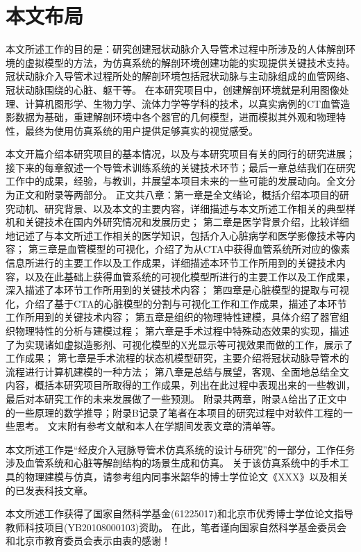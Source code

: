 \section{本文布局}
\label{sec1-4}

本文所述工作的目的是：研究创建冠状动脉介入导管术过程中所涉及的人体解剖环境的虚拟模型的方法，为仿真系统的解剖环境创建功能的实现提供关键技术支持。
冠状动脉介入导管术过程所处的解剖环境包括冠状动脉与主动脉组成的血管网络、冠状动脉围绕的心脏、躯干等。
在本研究项目中，创建解剖环境就是利用图像处理、计算机图形学、生物力学、流体力学等学科的技术，以真实病例的CT血管造影数据为基础，重建解剖环境中各个器官的几何模型，进而模拟其外观和物理特性，最终为使用仿真系统的用户提供足够真实的视觉感受。

本文开篇介绍本研究项目的基本情况，以及与本研究项目有关的同行的研究进展；接下来的每章叙述一个导管术训练系统的关键技术环节；最后一章总结我们在研究工作中的成果，经验，与教训，并展望本项目未来的一些可能的发展动向。全文分为正文和附录等两部分。
正文共八章：第一章是全文绪论，概括介绍本项目的研究动机、研究背景、以及本文的主要内容，详细描述与本文所述工作相关的典型样机和关键技术在国内外研究情况和发展历史；
第二章是医学背景介绍，比较详细地记述了与本文所述工作相关的医学知识，包括介入心脏病学和医学影像技术等内容；
第三章是血管模型的可视化，介绍了为从CTA中获得血管系统所对应的像素信息所进行的主要工作以及工作成果，详细描述本环节工作所用到的关键技术内容，以及在此基础上获得血管系统的可视化模型所进行的主要工作以及工作成果，深入描述了本环节工作所用到的关键技术内容；
第四章是心脏模型的提取与可视化，介绍了基于CTA的心脏模型的分割与可视化工作和工作成果，描述了本环节工作所用到的关键技术内容；
第五章是组织的物理特性建模，具体介绍了器官组织物理特性的分析与建模过程；
第六章是手术过程中特殊动态效果的实现，描述了为实现诸如虚拟造影剂、可视化模型的X光显示等可视效果而做的工作，展示了工作成果；
第七章是手术流程的状态机模型研究，主要介绍将冠状动脉导管术的流程进行计算机建模的一种方法；
第八章是总结与展望，客观、全面地总结全文内容，概括本研究项目所取得的工作成果，列出在此过程中表现出来的一些教训，最后对本研究工作的未来发展做了一些预测。
附录共两章，附录A给出了正文中的一些原理的数学推导；附录B记录了笔者在本项目的研究过程中对软件工程的一些思考。
文末附有参考文献和本人在学期间发表文章的清单等。

本文所述工作是“经皮介入冠脉导管术仿真系统的设计与研究”的一部分，工作任务涉及血管系统和心脏等解剖结构的场景生成和仿真。
关于该仿真系统中的手术工具的物理建模与仿真，请参考组内同事米韶华的博士学位论文《XXX》以及相关的已发表科技文章。

本文所述工作获得了国家自然科学基金(61225017)和北京市优秀博士学位论文指导教师科技项目(YB20108000103)资助。
在此，笔者谨向国家自然科学基金委员会和北京市教育委员会表示由衷的感谢！ 